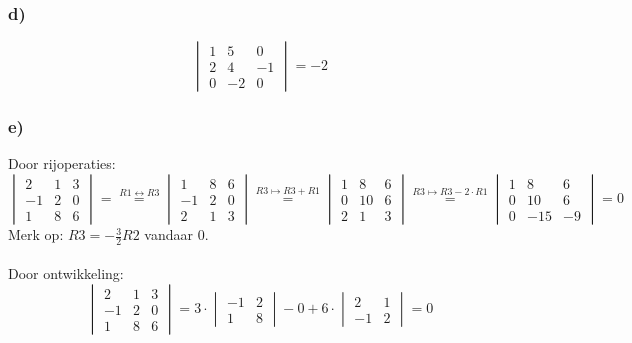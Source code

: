 \documentclass[lineaire_algebra_oplossingen.tex]{subfiles}
\begin{document}
\subsubsection*{d)}
\[
\begin{vmatrix}
1 & 5 & 0\\
2 & 4 & -1\\
0 & -2 & 0
\end{vmatrix}
= -2
\]
\subsubsection*{e)}
Door rijoperaties:
$$
\begin{vmatrix}
2 & 1 & 3\\
-1 & 2 & 0\\
1 & 8 & 6
\end{vmatrix}
=
\overset{R1 \leftrightarrow R3}{=}
\begin{vmatrix}
1 & 8 & 6\\
-1 & 2 & 0\\
2 & 1 & 3
\end{vmatrix}
\overset{R3 \longmapsto R3 + R1}{=}
\begin{vmatrix}
1 & 8 & 6\\
0 & 10 & 6\\
2 & 1 & 3
\end{vmatrix}
\overset{R3 \longmapsto R3 - 2\cdot R1}{=}
\begin{vmatrix}
1 & 8 & 6\\
0 & 10 & 6\\
0 & -15 & -9
\end{vmatrix}
= 0
$$
Merk op: $R3 = -\frac{3}{2} R2$ vandaar $0$.\\
\\
Door ontwikkeling:
$$
\begin{vmatrix}
2 & 1 & 3\\
-1 & 2 & 0\\
1 & 8 & 6
\end{vmatrix}
=
3 \cdot
\begin{vmatrix}
-1 & 2\\
1 & 8
\end{vmatrix}
-0
+6 \cdot
\begin{vmatrix}
2 & 1\\
-1 & 2
\end{vmatrix}
= 0
$$
\end{document}
